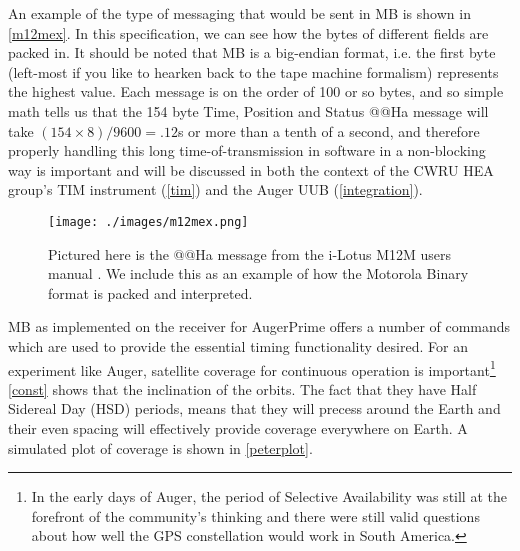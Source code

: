 An example of the type of messaging that would be sent in MB is shown in \autoref{m12mex}. In this specification, we can see how the bytes of different fields are packed in. It should be noted that MB is a big-endian format, i.e. the first byte (left-most if you like to hearken back to the tape machine formalism) represents the highest value. Each message is on the order of 100 or so bytes, and so simple math tells us that the 154 byte Time, Position and Status @@Ha message will take $(154\times 8)/9600=.12$s or more than a tenth of a second, and therefore properly handling this long time-of-transmission in software in a non-blocking way is important and will be discussed in both the context of the CWRU HEA group's TIM instrument (\autoref{tim}) and the Auger UUB (\autoref{integration}). %



\begin{figure}[h!]
\centering
\texttt{[image: ./images/m12mex.png]}
\caption[Example of a Motorola Binary Message]{Pictured here is the @@Ha message from the i-Lotus M12M users manual \cite{m12muser}. We include this as an example of how the Motorola Binary format is packed and interpreted.}
\label{m12mex}
\end{figure}

MB as implemented on the receiver for AugerPrime offers a number of commands which are used to provide the essential timing functionality desired. For an experiment like Auger, satellite coverage for continuous operation is important\footnote{In the early days of Auger, the period of Selective Availability was still at the forefront of the community's thinking and there were still valid questions about how well the GPS constellation would work in South America.} \autoref{const} shows that the inclination of the orbits. The fact that they have Half Sidereal Day (HSD) periods, means that they will precess around the Earth and their even spacing will effectively provide coverage everywhere on Earth. A simulated plot of coverage is shown in \autoref{peterplot}.

